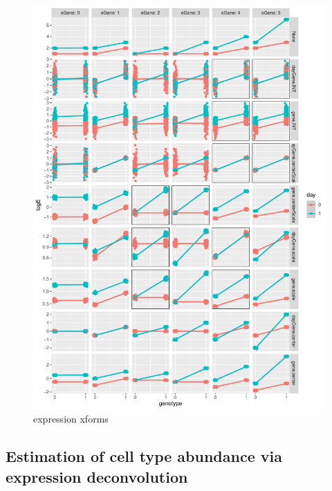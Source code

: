 \begin{figure}
    \centering
    \includegraphics[width=1.0\textwidth,page=1]{mainmatter/figures/chapter_03/simulate_expression_transforms.pdf}
    \caption{expression xforms}
    \label{fig:hird_eQTL_expressionTransform_sims}
\end{figure}

\subsection{Estimation of cell type abundance via expression deconvolution}

